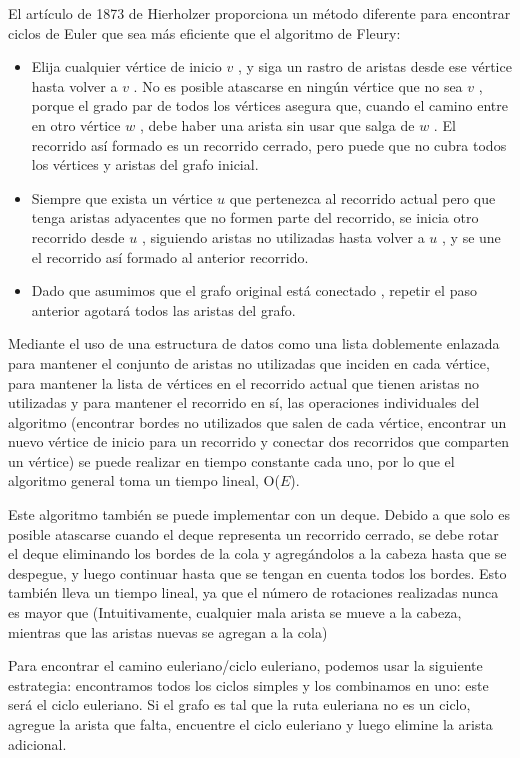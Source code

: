 El artículo de 1873 de Hierholzer proporciona un método diferente para encontrar ciclos de Euler que sea más eficiente que el algoritmo de Fleury:

\begin{itemize}
	\item Elija cualquier vértice de inicio $v$ , y siga un rastro de aristas desde ese vértice hasta volver a $v$ . No es posible atascarse en ningún vértice que no sea $v$ , porque el grado par de todos los vértices asegura que, cuando el camino entre en otro vértice $w$ , debe haber una arista sin usar que salga de $w$ . El recorrido así formado es un recorrido cerrado, pero puede que no cubra todos los vértices y aristas del grafo inicial.
	\item Siempre que exista un vértice $u$ que pertenezca al recorrido actual pero que tenga aristas adyacentes que no formen parte del recorrido, se inicia otro recorrido desde $u$ , siguiendo aristas no utilizadas hasta volver a $u$ , y se une el recorrido así formado al anterior recorrido.
	\item Dado que asumimos que el grafo original está conectado , repetir el paso anterior agotará todos las aristas del grafo.
\end{itemize}

Mediante el uso de una estructura de datos como una lista doblemente enlazada para mantener el conjunto de aristas no utilizadas que inciden en cada vértice, para mantener la lista de vértices en el recorrido actual que tienen aristas no utilizadas y para mantener el recorrido en sí, las operaciones individuales del algoritmo (encontrar bordes no utilizados que salen de cada vértice, encontrar un nuevo vértice de inicio para un recorrido y conectar dos recorridos que comparten un vértice) se puede realizar en tiempo constante cada uno, por lo que el algoritmo general toma un tiempo lineal, O($E$).

Este algoritmo también se puede implementar con un deque. Debido a que solo es posible atascarse cuando el deque representa un recorrido cerrado, se debe rotar el deque eliminando los bordes de la cola y agregándolos a la cabeza hasta que se despegue, y luego continuar hasta que se tengan en cuenta todos los bordes. Esto también lleva un tiempo lineal, ya que el número de rotaciones realizadas nunca es mayor que  (Intuitivamente, cualquier mala arista se mueve a la cabeza, mientras que las aristas nuevas se agregan a la cola)

Para encontrar el camino euleriano/ciclo euleriano, podemos usar la siguiente estrategia: encontramos todos los ciclos simples y los combinamos en uno: este será el ciclo euleriano. Si el grafo es tal que la ruta euleriana no es un ciclo, agregue la arista que falta, encuentre el ciclo euleriano y luego elimine la arista adicional.

